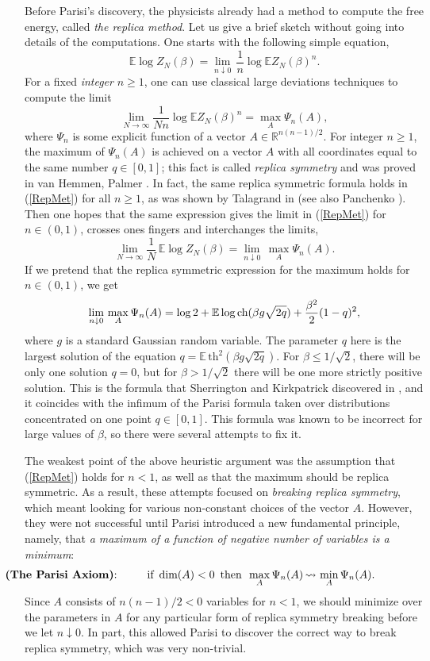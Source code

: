 \documentclass[12pt]{article}
\newcommand{\ch}{{\mbox{\rm ch}}}
\newcommand{\e}{\mathbb{E}}
\newcommand{\Reals}{\mathbb{R}}
\theoremstyle{nonumberplain}
\begin{document}
Before Parisi's discovery, the physicists already had a method to compute the free energy, called \emph{the replica method}. Let us give a brief sketch without going into details of the computations. One starts with the following simple equation,
$$
\e \log Z_N(\beta) = \lim_{n\downarrow 0}\, \frac{1}{n}\log \e Z_N(\beta)^n.
$$
For a fixed \emph{integer} $n\geq 1$, one can use classical large deviations techniques to compute the limit
\begin{equation}
\lim_{N\to\infty} \frac{1}{Nn}\log \e Z_N(\beta)^n = \max_A \Psi_n(A),
\label{RepMet}
\end{equation}
where $\Psi_n$ is some explicit function of a vector $A\in\Reals^{n(n-1)/2}$. For integer $n\geq 1$, the maximum of $\Psi_n(A)$ is achieved on a vector $A$ with all coordinates equal to the same number $q\in [0,1]$; this fact is called \emph{replica symmetry} and was proved in van Hemmen, Palmer \cite{VHP}. In fact, the same replica symmetric formula holds in (\ref{RepMet}) for all $n\geq 1$, as was shown by Talagrand in \cite{TalCortona} (see also Panchenko \cite{PRM}). Then one hopes that the same expression gives the limit in (\ref{RepMet}) for $n\in(0,1)$, crosses ones fingers and interchanges the limits,
$$
\lim_{N\to\infty} \frac{1}{N}\,\e \log Z_N(\beta) = \lim_{n\downarrow 0}\,\max_A \Psi_n(A).
$$
If we pretend that the replica symmetric expression for the maximum holds for $n\in(0,1)$, we get
$$
\lim_{n\downarrow 0}\,\max_A \Psi_n(A)
=
\log 2 + \e\log \ch(\beta g \sqrt{2q}) + \frac{\beta^2}{2}(1-q)^2,
$$
where $g$ is a standard Gaussian random variable. The parameter $q$ here is the largest solution of the equation $q= \e\, \mbox{th}^2(\beta g \sqrt{2q}).$ For $\beta\leq 1/\sqrt{2}$, there will be only one solution $q=0$, but for $\beta> 1/\sqrt{2}$ there will be one more strictly positive solution. This is the formula that Sherrington and Kirkpatrick discovered in \cite{SK}, and it coincides with the infimum of the Parisi formula taken over distributions concentrated on one point $q\in [0,1]$. This formula was known to be incorrect for large values of $\beta$, so there were several attempts to fix it. 

The weakest point of the above heuristic argument was the assumption that (\ref{RepMet}) holds for $n<1$, as well as that the maximum should be replica symmetric. As a result, these attempts focused on \emph{breaking replica symmetry}, which meant looking for various non-constant choices of the vector $A$. However, they were not successful until Parisi introduced a new fundamental principle, namely, that \emph{a maximum of a function of negative number of variables is a minimum}:
$$
\hspace{-2.2cm}\mbox{\textbf{(The Parisi Axiom)}:\hspace{0.8cm} if } \,\mbox{dim}(A)<0 \,\mbox{ then }\,
\max_A \Psi_n(A) \, {\rightsquigarrow} \, \min_A \Psi_n(A).
$$
Since $A$ consists of $n(n-1)/2<0$ variables for $n<1$, we should minimize over the parameters in $A$ for any particular form of replica symmetry breaking before we let $n\downarrow 0$. In part, this allowed Parisi to discover the correct way to break replica symmetry, which was very non-trivial. 
\end{document}

